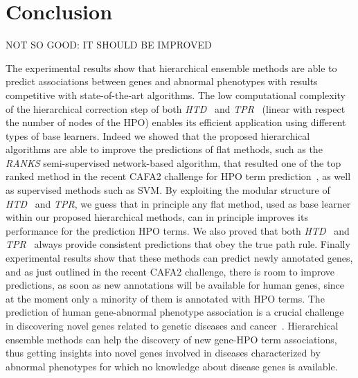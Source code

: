 \documentclass{bioinfo}
\newcommand{\htd}{{\em HTD}}
\newcommand{\tpr}{{\em TPR}}
\begin{document}
\section{Conclusion}
NOT SO GOOD: IT SHOULD BE IMPROVED

The experimental results show that hierarchical ensemble methods are able to predict associations between genes and abnormal phenotypes with results competitive with state-of-the-art algorithms. 
The low computational complexity of the hierarchical correction step of both \htd~ and \tpr~ (linear with respect the number of nodes of the HPO) enables its efficient application using different types of base learners. Indeed we showed that the proposed hierarchical algorithms are able to improve the predictions of flat methods, such as the {\em RANKS} semi-supervised network-based algorithm, that resulted one of the top ranked method in the recent CAFA2 challenge for HPO term prediction~\citep{Jiang16}, as well as supervised methods such as SVM. By exploiting the modular structure of \htd~ and \tpr, we guess that in principle any flat method,  used as base learner within our proposed hierarchical methods, can in principle improves its performance for the prediction HPO terms. 
We also proved that both \htd~ and \tpr~ always provide consistent predictions that obey the true path rule.
Finally experimental results show that these methods can predict newly annotated genes, and as just outlined in the recent CAFA2 challenge, there is room to improve predictions, as soon as new annotations will be available for human genes, since at the moment only a minority of them is annotated with HPO terms.
The prediction of human gene-abnormal phenotype association is a crucial challenge in discovering novel genes related to genetic diseases and cancer~\citep{boycot13, Kohler14b}. Hierarchical ensemble methods can help the discovery of new gene-HPO term associations, thus getting insights into novel genes involved in diseases characterized by abnormal phenotypes for which no knowledge about disease genes is available. 

\end{document}
